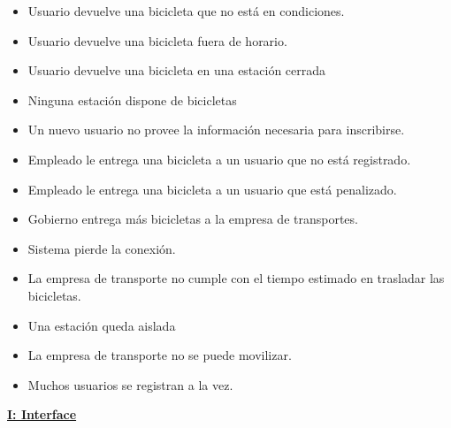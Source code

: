 \begin{itemize}
\item Usuario devuelve una bicicleta que no está en condiciones.
\item Usuario devuelve una bicicleta fuera de horario.
\item Usuario devuelve una bicicleta en una estación cerrada
\item Ninguna estación dispone de bicicletas
\item Un nuevo usuario no provee la información necesaria para inscribirse.
\item Empleado le entrega una bicicleta a un usuario que no está registrado.
\item Empleado le entrega una bicicleta a un usuario que está penalizado.
\item Gobierno entrega más bicicletas a la empresa de transportes.
\item Sistema pierde la conexión.
\item La empresa de transporte no cumple con el tiempo estimado en trasladar las bicicletas.
\item Una estación queda aislada
\item La empresa de transporte no se puede movilizar.
\item Muchos usuarios se registran a la vez.
\end{itemize}

\vspace{1cm}
\textbf{\underline{I: Interface}}

